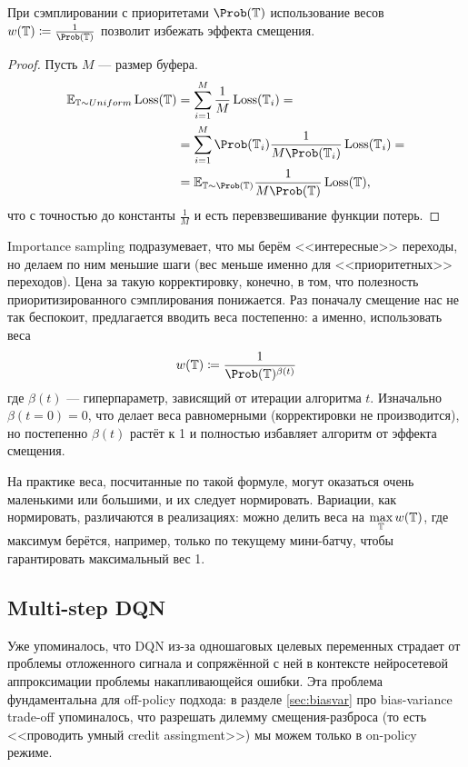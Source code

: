 \begin{theorem}
При сэмплировании с приоритетами $\Prob( \T )$ использование весов $w(\T) \coloneqq \frac{1}{\Prob (\T )}$ позволит избежать эффекта смещения.
\begin{proof} Пусть $M$ --- размер буфера.
\begin{align*}
\mathbb{E}_{\T \sim \mathop{Uniform}} \Loss(\T ) &= \sum_{i=1}^M \frac{1}{M} \Loss(\T_i) = \\ 
&= \sum_{i=1}^M \Prob (\T_i) \frac{1}{M\Prob (\T_i)} \Loss(\T_i) = \\
&= \mathbb{E}_{\T \sim \Prob (\T)} \frac{1}{M\Prob (\T )} \Loss(\T),
\end{align*}
что с точностью до константы $\frac{1}{M}$ и есть перевзвешивание функции потерь.
\end{proof}
\end{theorem}

Importance sampling подразумевает, что мы берём <<интересные>> переходы, но делаем по ним меньшие шаги (вес меньше именно для <<приоритетных>> переходов). Цена за такую корректировку, конечно, в том, что полезность приоритизированного сэмплирования понижается. Раз поначалу смещение нас не так беспокоит, предлагается вводить веса постепенно: а именно, использовать веса
$$w(\T) \coloneqq \frac{1}{\Prob (\T )^{\beta(t)}}$$
где $\beta(t)$ --- гиперпараметр, зависящий от итерации алгоритма $t$. Изначально $\beta(t=0) = 0$, что делает веса равномерными (корректировки не производится), но постепенно $\beta(t)$ растёт к 1 и полностью избавляет алгоритм от эффекта смещения.

\begin{remark}
На практике веса, посчитанные по такой формуле, могут оказаться очень маленькими или большими, и их следует нормировать. Вариации, как нормировать, различаются в реализациях: можно делить веса на $\max\limits_{\mathbb{T}} w(\mathbb{T})$, где максимум берётся, например, только по текущему мини-батчу, чтобы гарантировать максимальный вес 1.
\end{remark}

\subsection{Multi-step DQN}\label{subsec:multistepdqn}

Уже упоминалось, что DQN из-за одношаговых целевых переменных страдает от проблемы отложенного сигнала и сопряжённой с ней в контексте нейросетевой аппроксимации проблемы накапливающейся ошибки. Эта проблема фундаментальна для off-policy подхода: в разделе \ref{sec:biasvar} про bias-variance trade-off упоминалось, что разрешать дилемму смещения-разброса (то есть <<проводить умный credit assingment>>) мы можем только в on-policy режиме. 

